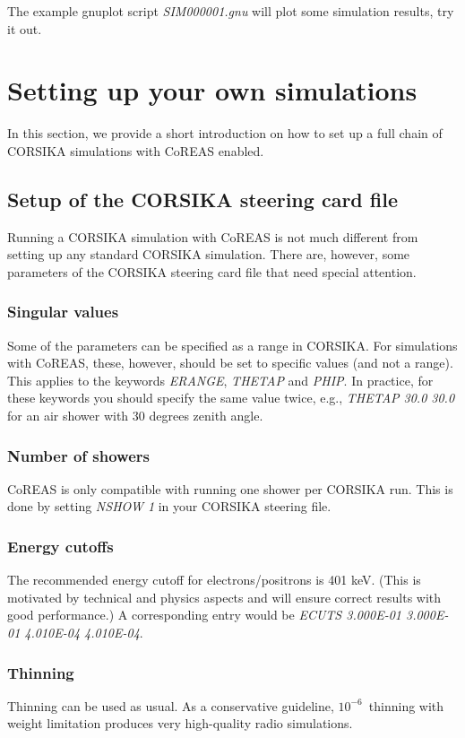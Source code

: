 \documentclass[a4paper,10pt]{article}
\begin{document}
The example gnuplot script {\it SIM000001.gnu} will plot some simulation results, try it out.

\section{Setting up your own simulations}

In this section, we provide a short introduction on how to set up a full chain of CORSIKA simulations with CoREAS enabled.

\subsection{Setup of the CORSIKA steering card file}

Running a CORSIKA simulation with CoREAS is not much different from setting up any standard CORSIKA simulation. There are, however, some parameters of the CORSIKA steering card file that need special attention.

\subsubsection{Singular values}
Some of the parameters can be specified as a range in CORSIKA. For simulations with CoREAS, these, however, should be set to specific values (and not a range). This applies to the keywords {\it ERANGE}, {\it THETAP} and {\it PHIP}. In practice, for these keywords you should specify the same value twice, e.g., {\it THETAP 30.0 30.0} for an air shower with 30 degrees zenith angle.

\subsubsection{Number of showers}
CoREAS is only compatible with running one shower per CORSIKA run. This is done by setting {\it NSHOW 1} in your CORSIKA steering file.

\subsubsection{Energy cutoffs}
The recommended energy cutoff for electrons/positrons is 401 keV. (This is motivated by technical and physics aspects and will ensure correct results with good performance.) A corresponding entry would be {\it ECUTS   3.000E-01 3.000E-01 4.010E-04 4.010E-04}.

\subsubsection{Thinning}
Thinning can be used as usual. As a conservative guideline, $10^{-6}$~thinning with weight limitation \citep{Kobal2001} produces very high-quality radio simulations.
\end{document}
